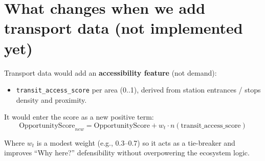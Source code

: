 \documentclass[11pt]{article}
\begin{document}
\section{What changes when we add transport data (not implemented yet)}
Transport data would add an \textbf{accessibility feature} (not demand):
\begin{itemize}
  \item \texttt{transit\_access\_score} per area (0..1), derived from station entrances / stops density and proximity.
\end{itemize}

\noindent It would enter the score as a new positive term:
\[
\text{OpportunityScore}_{new}
= \text{OpportunityScore} + w_t\cdot n(\text{transit\_access\_score})
\]

\noindent Where $w_t$ is a modest weight (e.g., 0.3--0.7) so it acts as a tie-breaker and improves ``Why here?'' defensibility without overpowering the ecosystem logic.
\end{document}
